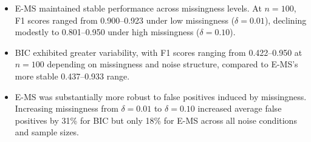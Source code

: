 \documentclass[
  12pt,
]{article}
\begin{document}


\begin{itemize}
    \item E-MS maintained stable performance across missingness 
    levels. At $n = 100$, F1 scores ranged from 0.900--0.923 under low 
    missingness ($\delta = 0.01$), declining modestly to 0.801--0.950 under 
    high missingness ($\delta = 0.10$).

    \item BIC exhibited greater variability, with F1 scores ranging 
    from 0.422--0.950 at $n = 100$ depending on missingness and noise 
    structure, compared to E-MS's more stable 0.437--0.933 range.

    \item E-MS was substantially more robust to false positives 
    induced by missingness. Increasing missingness from $\delta = 0.01$ to 
    $\delta = 0.10$ increased average false positives by 31\% for BIC but 
    only 18\% for E-MS across all noise conditions and sample sizes.
\end{itemize}


\end{document}
